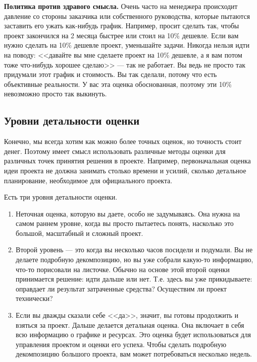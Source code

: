 \documentclass{../../text-style}
\begin{document}
\textbf{Политика против здравого смысла.} Очень часто на менеджера происходит давление со стороны заказчика или собственного руководства, которые пытаются заставить его ужать как-нибудь график. Например, просит сделать так, чтобы проект закончился на 2 месяца быстрее или стоил на 10\% дешевле. Если вам нужно сделать на 10\% дешевле проект, уменьшайте задачи. Никогда нельзя идти на поводу: <<давайте вы мне сделаете проект на 10\% дешевле, а я вам потом тоже что-нибудь хорошее сделаю>> --- так не работает. Вы ведь не просто так придумали этот график и стоимость. Вы так сделали, потому что есть объективные реальности. У вас эта оценка обоснованная, поэтому эти 10\% невозможно просто так выкинуть.

\subsection{Уровни детальности оценки}

Конечно, мы всегда хотим как можно более точных оценок, но точность стоит денег. Поэтому имеет смысл использовать различные методы оценки для различных точек принятия решения в проекте. Например, первоначальная оценка идеи проекта не должна занимать столько времени и усилий, сколько детальное планирование, необходимое для официального проекта.

Есть три уровня детальности оценки.

\begin{enumerate}
    \item Неточная оценка, которую вы даете, особо не задумываясь. Она нужна на самом раннем уровне, когда вы просто пытаетесь понять, насколько это большой, масштабный и сложный проект.
    \item Второй уровень --- это когда вы несколько часов посидели и подумали. Вы не делаете подробную декомпозицию, но вы уже собрали какую-то информацию, что-то порисовали на листочке. Обычно на основе этой второй оценки принимается решение: идти дальше или нет. Т.е. здесь вы уже прикидываете: оправдает ли результат затраченные средства? Осуществим ли проект технически?
    \item Если вы дважды сказали себе <<да>>, значит, вы готовы продолжить и взяться за проект. Дальше делается детальная оценка. Она включает в себя всю информацию о графике и ресурсах. Это оценка будет использоваться для управления проектом и оценки его успеха. Чтобы сделать подробную декомпозицию большого проекта, вам может потребоваться несколько недель.
\end{enumerate}
\end{document}
